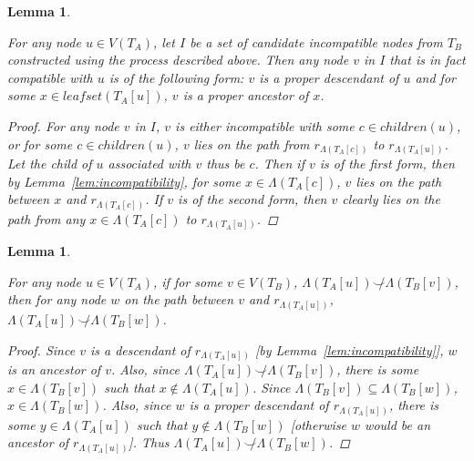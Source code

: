 \documentclass{article}
\newcommand{\compatible}{\smile}
\newcommand{\leafset}{\Lambda}
\newtheorem{filterclustersfindingcompatible}[incompatibility]{Lemma}
\newtheorem{filterclustersfindingcompatibletermination}[incompatibility]{Lemma}
\begin{document}
    \begin{filterclustersfindingcompatible}
        \label{lem:filterclustersfindingcompatible}

        For any node $u \in V(T_A)$, let $I$ be a set of candidate incompatible nodes from $T_B$ constructed using the process described above. Then any node $v$ in $I$ that is in fact compatible with $u$ is of the following form: $v$ is a proper descendant of $u$ and for some $x \in leafset(T_A[u])$, $v$ is a proper ancestor of $x$.

        \begin{proof}
            For any node $v$ in $I$, $v$ is either incompatible with some $c \in children(u)$, or for some $c \in children(u)$, $v$ lies on the path from $r_{\leafset(T_A[c])}$ to $r_{\leafset(T_A[u])}$. Let the child of $u$ associated with $v$ thus be $c$. Then if $v$ is of the first form, then by Lemma~\ref{lem:incompatibility}, for some $x \in \leafset(T_A[c])$, $v$ lies on the path between $x$ and $r_{\leafset(T_A[c])}$. If $v$ is of the second form, then $v$ clearly lies on the path from any $x \in \leafset(T_A[c])$ to $r_{\leafset(T_A[u])}$.
        \end{proof}
    \end{filterclustersfindingcompatible}

    \begin{filterclustersfindingcompatibletermination}
        \label{lem:filterclustersfindingcompatibletermination}

        For any node $u \in V(T_A)$, if for some $v \in V(T_B)$, $\leafset(T_A[u]) \not\compatible \leafset(T_B[v])$, then for any node $w$ on the path between $v$ and $r_{\leafset(T_A[u])}$, $\leafset(T_A[u]) \not\compatible \leafset(T_B[w])$.

        \begin{proof}
            Since $v$ is a descendant of $r_{\leafset(T_A[u])}$ [by Lemma~\ref{lem:incompatibility}], $w$ is an ancestor of $v$. Also, since $\leafset(T_A[u]) \not\compatible \leafset(T_B[v])$, there is some $x \in \leafset(T_B[v])$ such that $x \not\in \leafset(T_A[u])$. Since $\leafset(T_B[v]) \subseteq \leafset(T_B[w])$, $x \in \leafset(T_B[w])$. Also, since $w$ is a proper descendant of $r_{\leafset(T_A[u])}$, there is some $y \in \leafset(T_A[u])$ such that $y \not\in \leafset(T_B[w])$ [otherwise $w$ would be an ancestor of $r_{\leafset(T_A[u])}$]. Thus $\leafset(T_A[u]) \not\compatible \leafset(T_B[w])$.
        \end{proof}
    \end{filterclustersfindingcompatibletermination}
\end{document}
